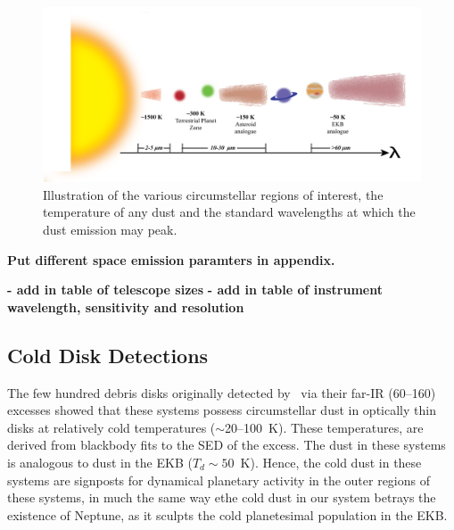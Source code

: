     \begin{figure}
    \centering
    \includegraphics[width=\textwidth]{Ch1/planet_sandwich_RPatel}
    \caption[Illustrating dust location and wavelength]{Illustration of the various circumstellar regions of interest, the temperature of any dust and the standard wavelengths at which the dust emission may peak.}
    \label{fig:planet_sandwich}
    \end{figure}
    
    
   
   
\textbf{ Put different space emission paramters in appendix.}
   
   \textbf{- add in table of telescope sizes}
   \textbf{- add in table of instrument wavelength, sensitivity and resolution}
   
   
   
   
   \subsection{Cold Disk Detections}
   
   
    The few hundred debris disks originally detected by \iras\ via their far-IR (60--160\micron) excesses showed that these systems possess circumstellar dust in optically thin disks at relatively cold temperatures ($\sim$20--100~K). These temperatures, are derived from blackbody fits to the SED of the excess. The dust in these systems is analogous to dust in the EKB ($T_d\sim50$~K). Hence, the cold dust in these systems are signposts for dynamical planetary activity in the outer regions of these systems, in much the same way ethe cold dust in our system betrays the existence of Neptune, as it sculpts the cold planetesimal population in the EKB. 
   
